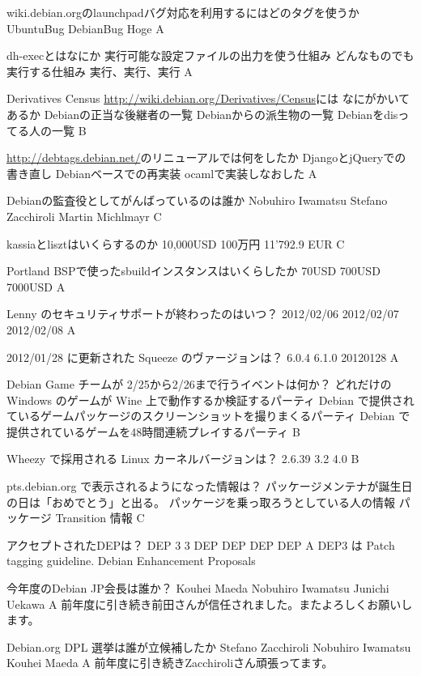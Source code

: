 \santaku
{wiki.debian.orgのlaunchpadバグ対応を利用するにはどのタグを使うか}
{UbuntuBug}
{DebianBug}
{Hoge}
{A}
{}

\santaku
{dh-execとはなにか}
{実行可能な設定ファイルの出力を使う仕組み}
{どんなものでも実行する仕組み}
{実行、実行、実行}
{A}
{}

\santaku
{Derivatives Census \url{http://wiki.debian.org/Derivatives/Census}には
なにがかいてあるか}
{Debianの正当な後継者の一覧}
{Debianからの派生物の一覧}
{Debianをdisってる人の一覧}
{B}
{}

\santaku
{\url{http://debtags.debian.net/}のリニューアルでは何をしたか}
{DjangoとjQueryでの書き直し}
{Debianベースでの再実装}
{ocamlで実装しなおした}
{A}
{}

\santaku
{Debianの監査役としてがんばっているのは誰か}
{Nobuhiro Iwamatsu}
{Stefano Zacchiroli}
{Martin Michlmayr}
{C}
{}

\santaku
{kassiaとlisztはいくらするのか}
{10,000USD}
{100万円}
{11'792.9 EUR}
{C}
{}

\santaku
{Portland BSPで使ったsbuildインスタンスはいくらしたか}
{70USD}
{700USD}
{7000USD}
{A}
{}

\santaku
{Lenny のセキュリティサポートが終わったのはいつ？}
{2012/02/06}
{2012/02/07}
{2012/02/08}
{A}
{}

\santaku
{2012/01/28 に更新された Squeeze のヴァージョンは？}
{6.0.4}
{6.1.0}
{20120128}
{A}
{}

\santaku
{Debian Game チームが 2/25から2/26まで行うイベントは何か？}
{どれだけの Windows のゲームが Wine 上で動作するか検証するパーティ}
{Debian で提供されているゲームパッケージのスクリーンショットを撮りまくるパーティ}
{Debian で提供されているゲームを48時間連続プレイするパーティ}
{B}
{}

\santaku
{Wheezy で採用される Linux カーネルバージョンは？}
{2.6.39}
{3.2}
{4.0}
{B}
{}

\santaku
{pts.debian.org で表示されるようになった情報は？}
{パッケージメンテナが誕生日の日は「おめでとう」と出る。}
{パッケージを乗っ取ろうとしている人の情報}
{パッケージ Transition 情報}
{C}
{}

\santaku
{アクセプトされたDEPは？}
{DEP 3}
{3 DEP }
{DEP DEP DEP}
{A}
{DEP3 は Patch tagging guideline. Debian Enhancement Proposals}

\santaku
{今年度のDebian JP会長は誰か？}
{Kouhei Maeda}
{Nobuhiro Iwamatsu}
{Junichi Uekawa}
{A}
{前年度に引き続き前田さんが信任されました。またよろしくお願いします。}


\santaku
{Debian.org DPL 選挙は誰が立候補したか}
{Stefano Zacchiroli}
{Nobuhiro Iwamatsu}
{Kouhei Maeda}
{A}
{前年度に引き続きZacchiroliさん頑張ってます。}

